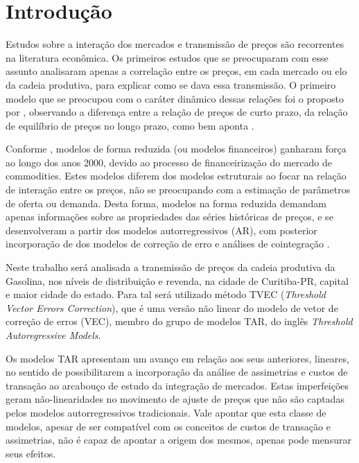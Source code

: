 \documentclass[
	article,			%
	12pt,				%
	openright,			%
	oneside,			%
	a4paper,			%
	english,			%
	brazil				%
	]{abntex2}
\begin{document}
\cleardoublepage
\section{Introdução}

Estudos sobre a interação dos mercados e transmissão de preços são recorrentes na literatura econômica. Os primeiros estudos que se preocuparam com esse assunto analisaram apenas a correlação entre os preços, em cada mercado ou elo da cadeia produtiva, para explicar como se dava essa transmissão. O primeiro modelo que se preocupou com o caráter dinâmico dessas relações foi o proposto por , observando a diferença entre a relação de preços de curto prazo, da relação de equilíbrio de preços no longo prazo, como bem aponta .

Conforme , modelos de forma reduzida (ou modelos financeiros) ganharam força ao longo dos anos 2000, devido ao processo de financeirização do mercado de commodities. Estes modelos diferem dos modelos estruturais ao focar na relação de interação entre os preços, não se preocupando com a estimação de parâmetros de oferta ou demanda. Desta forma, modelos na forma reduzida demandam apenas informações sobre as propriedades das séries históricas de preços, e se desenvolveram a partir dos modelos autorregressivos (AR), com posterior incorporação de dos modelos de correção de erro e análises de cointegração .

Neste trabalho será analisada a transmissão de preços da cadeia produtiva da Gasolina, nos níveis de distribuição e revenda, na cidade de Curitiba-PR, capital e maior cidade do estado. Para tal será utilizado método TVEC (\textit{Threshold Vector Errors Correction}), que é uma versão não linear do modelo de vetor de correção de erros (VEC), membro do grupo de modelos TAR, do inglês \textit{Threshold Autoregressive Models}.

Os modelos TAR apresentam um avanço em relação aos seus anteriores, lineares, no sentido de possibilitarem a incorporação da análise de assimetrias e custos de transação  ao arcabouço de estudo da integração de mercados. Estas imperfeições geram não-linearidades no movimento de ajuste de preços que não são captadas pelos modelos autorregressivos tradicionais. Vale apontar que esta classe de modelos, apesar de ser compatível com os conceitos de custos de transação e assimetrias, não é capaz de apontar a origem dos mesmos, apenas pode mensurar seus efeitos.
\end{document}
